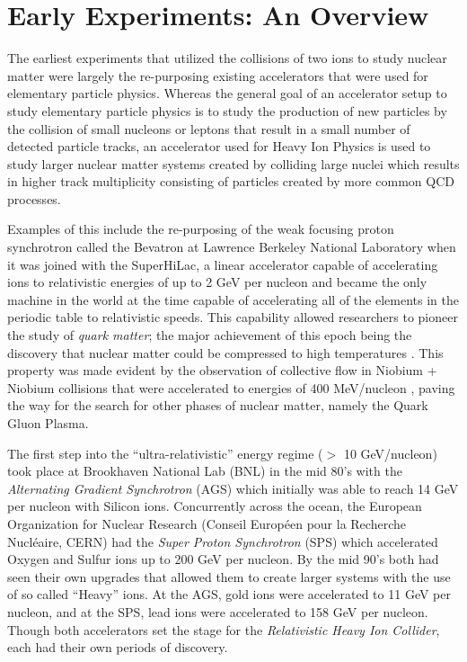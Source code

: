 \section{Early Experiments: An Overview} \label{sect:earlyexperiments}
The earliest experiments that utilized the collisions of two ions to study nuclear matter were largely the re-purposing existing accelerators that were used for elementary particle physics. Whereas the general goal of an accelerator setup to study elementary particle physics is to study the production of new particles by the collision of small nucleons or leptons that result in a small number of detected particle tracks, an accelerator used for Heavy Ion Physics is used to study larger nuclear matter systems created by colliding large nuclei which results in higher track multiplicity consisting of particles created by more common QCD processes. 

Examples of this include the re-purposing of the weak focusing proton synchrotron called the Bevatron at Lawrence Berkeley National Laboratory when it was joined with the SuperHiLac, a linear accelerator capable of accelerating ions to relativistic energies of up to 2 GeV per nucleon and became the only machine in the world at the time capable of accelerating all of the elements in the periodic table to relativistic speeds. This capability allowed researchers to pioneer the study of \textit{quark matter}\citep{bevalac9lives}; the major achievement of this epoch being the discovery that nuclear matter could be compressed to high temperatures \citep{ROBINSON857}. This property was made evident by the observation of collective flow in Niobium + Niobium collisions that were accelerated to energies of 400 MeV/nucleon \citep{PhysRevLett.52.1590}, paving the way for the search for other phases of nuclear matter, namely the Quark Gluon Plasma.

The first step into the ``ultra-relativistic'' energy regime ($>$ 10 GeV/nucleon) took place at Brookhaven National Lab (BNL) in the mid 80's with the \textit{Alternating Gradient Synchrotron} (AGS) which initially was able to reach 14 GeV per nucleon with Silicon ions. Concurrently across the ocean, the European Organization for Nuclear Research (Conseil Européen pour la Recherche Nucl\'{e}aire, CERN) had the \textit{Super Proton Synchrotron} (SPS) which accelerated Oxygen and Sulfur ions up to 200 GeV per nucleon. By the mid 90's both had seen their own upgrades that allowed them to create larger systems with the use of so called ``Heavy'' ions. At the AGS, gold ions were accelerated to 11 GeV per nucleon, and at the SPS, lead ions were accelerated to 158 GeV per nucleon\citep{wojciechphenomenology}. Though both accelerators set the stage for the \textit{Relativistic Heavy Ion Collider}, each had their own periods of discovery. 


